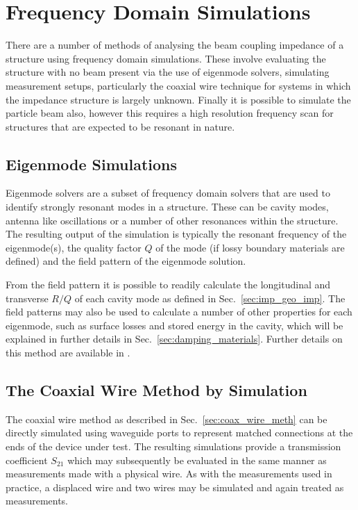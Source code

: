 \section{Frequency Domain Simulations}

There are a number of methods of analysing the beam coupling impedance of a structure using frequency domain simulations. These involve evaluating the structure with no beam present via the use of eigenmode solvers, simulating measurement setups, particularly the coaxial wire technique for systems in which the impedance structure is largely unknown. Finally it is possible to simulate the particle beam also, however this requires a high resolution frequency scan for structures that are expected to be resonant in nature.

\subsection{Eigenmode Simulations}

Eigenmode solvers are a subset of frequency domain solvers that are used to identify strongly resonant modes in a structure. These can be cavity modes, antenna like oscillations or a number of other resonances within the structure. The resulting output of the simulation is typically the resonant frequency of the eigenmode(s), the quality factor $Q$ of the mode (if lossy boundary materials are defined) and the field pattern of the eigenmode solution.

From the field pattern it is possible to readily calculate the longitudinal and transverse $R/Q$ of each cavity mode as defined in Sec.~\ref{sec:imp_geo_imp}. The field patterns may also be used to calculate a number of other properties for each eigenmode, such as surface losses and stored energy in the cavity, which will be explained in further details in Sec.~\ref{sec:damping_materials}. Further details on this method are available in \cite{Grudiev:LongTransSecCol}.

\subsection{The Coaxial Wire Method by Simulation}

The coaxial wire method as described in Sec.~\ref{sec:coax_wire_meth} can be directly simulated using waveguide ports to represent matched connections at the ends of the device under test. The resulting simulations provide a transmission coefficient $S_{21}$ which may subsequently be evaluated in the same manner as measurements made with a physical wire. As with the measurements used in practice, a displaced wire and two wires may be simulated and again treated as measurements. 


